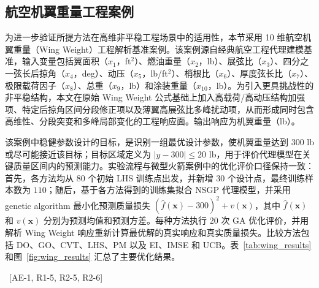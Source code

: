 \documentclass[]{interact}
\DeclareRobustCommand{\reviewadd}[2]{{\color{red}#1}\ {\color{blue}\footnotesize[#2]}}
\theoremstyle{plain}%
\theoremstyle{definition}
\theoremstyle{remark}
\begin{document}
\reviewadd{\subsection{航空机翼重量工程案例}
为进一步验证所提方法在高维非平稳工程场景中的适用性，本节采用 10 维航空机翼重量（Wing Weight）工程解析基准案例。该案例源自经典航空工程代理建模基准，输入变量包括翼面积（$x_1$，ft$^2$）、燃油重量（$x_2$，lb）、展弦比（$x_3$）、四分之一弦长后掠角（$x_4$，deg）、动压（$x_5$，lb/ft$^2$）、梢根比（$x_6$）、厚度弦长比（$x_7$）、极限载荷因子（$x_8$）、总重（$x_9$，lb）和涂装重量（$x_{10}$，lb）。为引入更具挑战性的非平稳结构，本文在原始 Wing Weight 公式基础上加入高载荷/高动压结构加强项、特定后掠角区间分段修正项以及薄翼高展弦比多峰扰动项，从而形成同时包含高维性、分段突变和多峰局部变化的工程响应面。输出响应为机翼重量（lb）。

该案例中稳健参数设计的目标，是识别一组最优设计参数，使机翼重量达到 $300$ lb 或尽可能接近该目标；目标区域定义为 $|y-300|\le20$ lb，用于评价代理模型在关键质量区间内的预测能力。实验流程与微型火箭案例中的优化评价口径保持一致：首先，各方法均从 $80$ 个初始 LHS 训练点出发，并新增 $30$ 个设计点，最终训练样本数为 $110$；随后，基于各方法得到的训练集拟合 NSGP 代理模型，并采用 genetic algorithm 最小化预测质量损失 $(\hat f(\mathbf{x})-300)^2+v(\mathbf{x})$，其中 $\hat f(\mathbf{x})$ 和 $v(\mathbf{x})$ 分别为预测均值和预测方差。每种方法执行 $20$ 次 GA 优化评价，并用解析 Wing Weight 响应重新计算最优解的真实响应和真实质量损失。比较方法包括 DO、GO、CVT、LHS、PM 以及 EI、IMSE 和 UCB。表~\ref{tab:wing_results} 和图~\ref{fig:wing_results} 汇总了主要优化结果。}{AE-1, R1-5, R2-5, R2-6}
\end{document}
